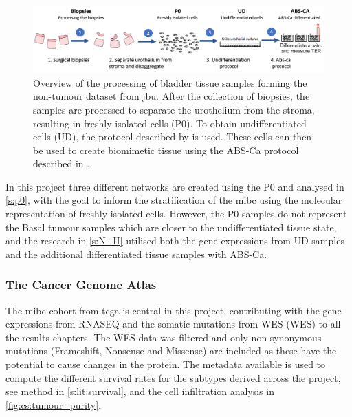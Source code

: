 \begin{figure}[!b]
    \centering
    \includegraphics[width=1.0\textwidth, keepaspectratio]{Sections/Lit_review/Resources/differentiation.png}
    \caption[Bladder samples protcol for the healthy dataset]{Overview of the processing of bladder tissue samples forming the non-tumour dataset from \acrfull{jbu}. After the collection of biopsies, the samples are processed to separate the urothelium from the stroma, resulting in freshly isolated cells (P0). To obtain undifferentiated cells (UD), the protocol described by \citet{Cross2005-fe} is used. These cells can then be used to create biomimetic tissue using the ABS-Ca protocol described in \citet{Cross2005-fe}.}
    \label{fig:lit:diff_samples}
\end{figure}


In this project three different networks are created using the P0 and analysed in \cref{s:p0}, with the goal to inform the stratification of the \acrshort{mibc} using the molecular representation of freshly isolated cells. However, the P0 samples do not represent the Basal tumour samples which are closer to the  undifferentiated tissue state, and the research in \cref{s:N_II} utilised both the gene expressions from UD samples and the additional differentiated tissue samples with ABS-Ca.

\subsubsection*{The Cancer Genome Atlas} \label{s:lit:tcga_data}

The \acrshort{mibc} cohort from \acrfull{tcga} is central in this project, contributing with the gene expressions from \gls{RNASEQ} and the somatic mutations from \gls{WES} (WES) to all the results chapters.  The WES data was filtered and only non-synonymous mutations (Frameshift, Nonsense and Missense) are included as these have the potential to cause changes in the protein. The metadata available is used to compute the different survival rates for the subtypes derived across the project, see method in \cref{s:lit:survival}, and the cell infiltration analysis in \cref{fig:cs:tumour_purity}.
